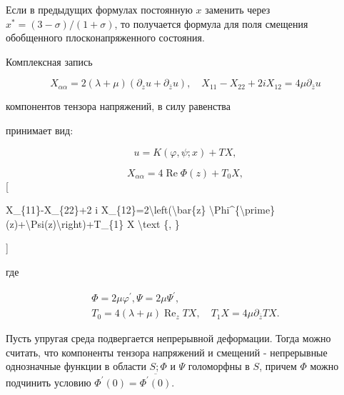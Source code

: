 \documentclass[10pt]{article}
\begin{document}
Если в предыдущих формулах постоянную $x$ заменить через $x^{*}=(3-\sigma) /(1+\sigma)$, то получается формула для поля смещения обобщенного плосконапряженного состояния.



Комплексная запись



\[

X_{\alpha \alpha}=2(\lambda+\mu)\left(\partial_{z} u+\partial_{\bar{z}} u\right), \quad X_{11}-X_{22}+2 i X_{12}=4 \mu \partial_{\bar{z}} u

\]



компонентов тензора напряжений, в силу равенства



принимает вид:



\[

u=K(\varphi, \psi ; x)+T X,

\]



\[

X_{\alpha \alpha}=4 \operatorname{Re} \Phi(z)+T_{0} X,

\][



X\_\{11\}-X\_\{22\}+2 i X\_\{12\}=2\textbackslash left(\textbackslash bar\{z\} \textbackslash Phi\^{}\{\textbackslash prime\}(z)+\textbackslash Psi(z)\textbackslash right)+T\_\{1\} X \textbackslash text \{, \}

]



где



\[

\begin{gathered}

\Phi=2 \mu \varphi^{\prime}, \Psi=2 \mu \Psi^{\prime}, \\

T_{0}=4(\lambda+\mu) \operatorname{Re}_{z} T X, \quad T_{1} X=4 \mu \partial_{\bar{z}} T X .

\end{gathered}

\]



Пусть упругая среда подвергается непрерывной деформации. Тогда можно считать, что компоненты тензора напряжений и смещений - непрерывные однозначные функции в области $S ; \Phi$ и $\Psi$ голоморфны в $S$, причем $\Phi$ можно подчинить условию $\Phi^{\prime}(0)=\overline{\Phi^{\prime}(0)}$.
\end{document}
